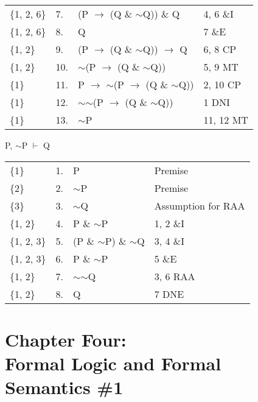 \documentclass[a4paper,12pt]{article}
\newcommand{\ra}{$\rightarrow$ }
\newcommand{\s}{$\sim$}
\newcommand{\vd}{$\vdash$ }
\begin{document}
\begin{enumerate}[label=\arabic*,leftmargin=*]
\begin{enumerate}[label=(\roman*)]
\begin{minipage}{\textwidth}
\begin{tabular}{l l l l}
                        \{1, 2, 6\} & 7. & (P \ra (Q \& \s Q)) \& Q & 4, 6 \&I\\
                        \{1, 2, 6\} & 8. & Q & 7 \&E\\
                        \{1, 2\} & 9. & (P \ra (Q \& \s Q)) \ra Q & 6, 8 CP\\
                        \{1, 2\} & 10. & \s (P \ra (Q \& \s Q)) & 5, 9 MT\\
                        \{1\} & 11. & P \ra \s (P \ra (Q \& \s Q)) & 2, 10 CP\\
                        \{1\} & 12. & \s \s (P \ra (Q \& \s Q)) & 1 DNI\\
                        \{1\} & 13. & \s P & 11, 12 MT\\
                    \end{tabular}
                \end{minipage}

        \end{enumerate}

        \begin{minipage}{\textwidth}
        \item P, \s P \vd Q
            \vspace{1em}\\
            \begin{tabular}{l l l l}
                \{1\} & 1. & P & Premise\\
                \{2\} & 2. & \s P & Premise\\
                \{3\} & 3. & \s Q & Assumption for RAA\\
                \{1, 2\} & 4. & P \& \s P & 1, 2 \&I\\
                \{1, 2, 3\} & 5. & (P \& \s P) \& \s Q & 3, 4 \&I\\
                \{1, 2, 3\} & 6. & P \& \s P & 5 \&E\\
                \{1, 2\} & 7. & \s \s Q & 3, 6 RAA\\
                \{1, 2\} & 8. & Q & 7 DNE\\
            \end{tabular}
        \end{minipage}

    \end{enumerate}

    \newpage

    \section*{Chapter Four:\\Formal Logic and Formal Semantics \#1}
\end{document}
